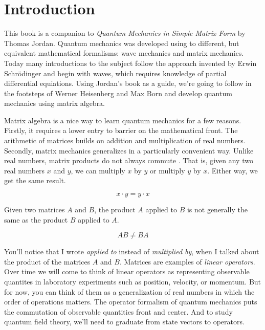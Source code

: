 \setchapterpreamble[u]{\margintoc}
\chapter{Introduction}

This book is a companion to \emph{Quantum Mechanics in Simple Matrix Form} \cite{Jordan2005} by Thomas Jordan. Quantum mechanics was developed using to different, but equivalent mathematical formalisms: wave mechanics and matrix mechanics. Today many introductions to the subject follow the approach invented by Erwin Schr\"odinger and begin with waves, which requires knowledge of partial differential equiations. Using Jordan's book as a guide, we're going to follow in the footsteps of Werner Heisenberg and Max Born and develop quantum mechanics using matrix algebra.

Matrix algebra is a nice way to learn quantum mechanics for a few reasons. Firstly, it requires a lower entry to barrier on the mathematical front. The arithmetic of matrices builds on addition and multiplication of real numbers. Secondly, matrix mechanics generalizes in a particularly convenient way. Unlike real numbers, matrix products do not always commute . That is, given any two real numbers $x$ and $y$, we can multiply $x$ by $y$ or multiply $y$ by $x$. Either way, we get the same result.

$$ x\cdot y = y \cdot x $$

Given two matrices $A$ and $B$, the product $A$ applied to $B$ is not generally the same as the product $B$ applied to $A$.

$$ AB \neq BA $$

You'll notice that I wrote \emph{applied to} instead of \emph{multiplied by}, when I talked about the product of the matrices $A$ and $B$. Matrices are examples of \emph{linear operators}. Over time we will come to think of linear operators as representing observable quantites in laboratory experiments such as position, velocity, or momentum. But for now, you can think of them as a generalization of real numbers in which the order of operations matters. The operator formalism of quantum mechanics puts the commutation of observable quantities front and center. And to study quantum field theory, we'll need to graduate from state vectors to operators.

